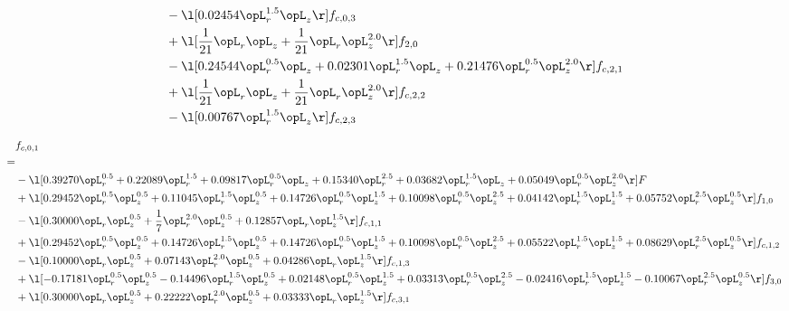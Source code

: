\begin{alignat}{2}
& - \l[  0.02454 \opL_r^{1.5} \opL_z  \r] f_{c,0,3} \nonumber \\ 
& + \l[ \frac{1}{21} \opL_r \opL_z + \frac{1}{21} \opL_r \opL_z^{2.0}  \r] f_{2,0} \nonumber \\ 
& - \l[  0.24544 \opL_r^{0.5} \opL_z +  0.02301 \opL_r^{1.5} \opL_z +  0.21476 \opL_r^{0.5} \opL_z^{2.0}  \r] f_{c,2,1} \nonumber \\ 
& + \l[ \frac{1}{21} \opL_r \opL_z + \frac{1}{21} \opL_r \opL_z^{2.0}  \r] f_{c,2,2} \nonumber \\ 
& - \l[  0.00767 \opL_r^{1.5} \opL_z  \r] f_{c,2,3} \nonumber \\ 
\end{alignat} 


\begin{alignat}{2} 
\label{eq:f_01_1} 
& f_{c,0,1} \nonumber \\ 
 = \\ 
& - \l[  0.39270 \opL_r^{0.5} +  0.22089 \opL_r^{1.5} +  0.09817 \opL_r^{0.5} \opL_z +  0.15340 \opL_r^{2.5} +  0.03682 \opL_r^{1.5} \opL_z +  0.05049 \opL_r^{0.5} \opL_z^{2.0}  \r] F \nonumber \\ 
& + \l[  0.29452 \opL_r^{0.5} \opL_z^{0.5} +  0.11045 \opL_r^{1.5} \opL_z^{0.5} +  0.14726 \opL_r^{0.5} \opL_z^{1.5} +  0.10098 \opL_r^{0.5} \opL_z^{2.5} +  0.04142 \opL_r^{1.5} \opL_z^{1.5} +  0.05752 \opL_r^{2.5} \opL_z^{0.5}  \r] f_{1,0} \nonumber \\ 
& - \l[  0.30000 \opL_r \opL_z^{0.5} + \frac{1}{7} \opL_r^{2.0} \opL_z^{0.5} +  0.12857 \opL_r \opL_z^{1.5}  \r] f_{c,1,1} \nonumber \\ 
& + \l[  0.29452 \opL_r^{0.5} \opL_z^{0.5} +  0.14726 \opL_r^{1.5} \opL_z^{0.5} +  0.14726 \opL_r^{0.5} \opL_z^{1.5} +  0.10098 \opL_r^{0.5} \opL_z^{2.5} +  0.05522 \opL_r^{1.5} \opL_z^{1.5} +  0.08629 \opL_r^{2.5} \opL_z^{0.5}  \r] f_{c,1,2} \nonumber \\ 
& - \l[  0.10000 \opL_r \opL_z^{0.5} +  0.07143 \opL_r^{2.0} \opL_z^{0.5} +  0.04286 \opL_r \opL_z^{1.5}  \r] f_{c,1,3} \nonumber \\ 
& + \l[  -0.17181 \opL_r^{0.5} \opL_z^{0.5}   -0.14496 \opL_r^{1.5} \opL_z^{0.5} +  0.02148 \opL_r^{0.5} \opL_z^{1.5} +  0.03313 \opL_r^{0.5} \opL_z^{2.5}   -0.02416 \opL_r^{1.5} \opL_z^{1.5}   -0.10067 \opL_r^{2.5} \opL_z^{0.5}  \r] f_{3,0} \nonumber \\ 
& + \l[  0.30000 \opL_r \opL_z^{0.5} +  0.22222 \opL_r^{2.0} \opL_z^{0.5} +  0.03333 \opL_r \opL_z^{1.5}  \r] f_{c,3,1} \nonumber \\ 

\end{alignat}
